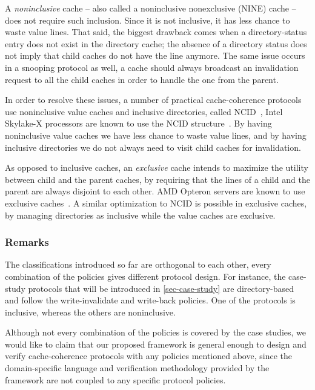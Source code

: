A \emph{noninclusive} cache -- also called a noninclusive nonexclusive (NINE) cache -- does not require such inclusion.
Since it is not inclusive, it has less chance to waste value lines.
That said, the biggest drawback comes when a directory-status entry does not exist in the directory cache; the absence of a directory status does not imply that child caches do not have the line anymore.
The same issue occurs in a snooping protocol as well, \eg{} a cache should always broadcast an invalidation request to all the child caches in order to handle the one from the parent.

In order to resolve these issues, a number of practical cache-coherence protocols use noninclusive value caches and inclusive directories, called NCID~\cite{Zhao:2010}, \eg{} Intel Skylake-X processors are known to use the NCID structure~\cite{intel-non-inclusive,Yan:2019}.
By having noninclusive value caches we have less chance to waste value lines, and by having inclusive directories we do not always need to visit child caches for invalidation.

As opposed to inclusive caches, an \emph{exclusive} cache intends to maximize the utility between child and the parent caches, by requiring that the lines of a child and the parent are always disjoint to each other.
AMD Opteron servers are known to use exclusive caches~\cite{Irazoqui:2016}.
A similar optimization to NCID is possible in exclusive caches, by managing directories as inclusive while the value caches are exclusive.

\subsubsection{Remarks}

The classifications introduced so far are orthogonal to each other, \ie{} every combination of the policies gives different protocol design.
For instance, the case-study protocols that will be introduced in \autoref{sec-case-study} are directory-based and follow the write-invalidate and write-back policies.
One of the protocols is inclusive, whereas the others are noninclusive.

Although not every combination of the policies is covered by the case studies, we would like to claim that our proposed framework \hemiola{} is general enough to design and verify cache-coherence protocols with any policies mentioned above, since the domain-specific language and verification methodology provided by the framework are not coupled to any specific protocol policies.

